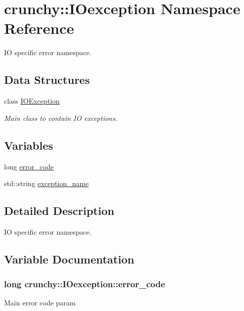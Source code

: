 \hypertarget{namespacecrunchy_1_1_i_oexception}{}\section{crunchy\+:\+:I\+Oexception Namespace Reference}
\label{namespacecrunchy_1_1_i_oexception}


IO specific error namespace.  


\subsection*{Data Structures}
\begin{DoxyCompactItemize}
\item 
class \hyperlink{classcrunchy_1_1_i_oexception_1_1_i_o_exception}{I\+O\+Exception}
\begin{DoxyCompactList}\small\item\em Main class to contain IO exceptions. \end{DoxyCompactList}\end{DoxyCompactItemize}
\subsection*{Variables}
\begin{DoxyCompactItemize}
\item 
long \hyperlink{namespacecrunchy_1_1_i_oexception_a09a5365aeccdc80079fb2d4624938683}{error\+\_\+code}
\item 
std\+::string \hyperlink{namespacecrunchy_1_1_i_oexception_a2c496a33c84b131ad1b2a7541f9a694c}{exception\+\_\+name}
\end{DoxyCompactItemize}


\subsection{Detailed Description}
IO specific error namespace. 

\subsection{Variable Documentation}
\subsubsection[{error\+\_\+code}]{\setlength{\rightskip}{0pt plus 5cm}long crunchy\+::\+I\+Oexception\+::error\+\_\+code}\hypertarget{namespacecrunchy_1_1_i_oexception_a09a5365aeccdc80079fb2d4624938683}{}\label{namespacecrunchy_1_1_i_oexception_a09a5365aeccdc80079fb2d4624938683}
Main error code param 
